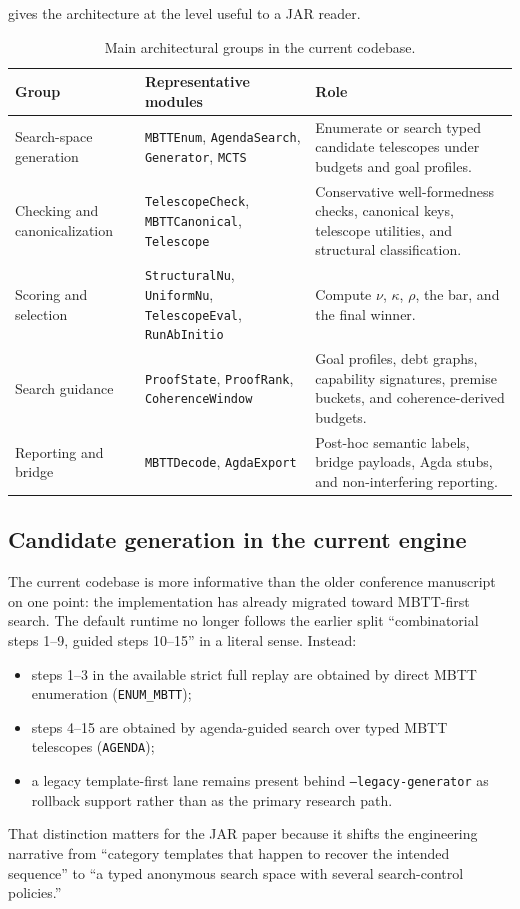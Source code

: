 \documentclass[11pt,a4paper]{article}
\begin{document}
 gives the architecture at the level useful to a JAR reader.

\begin{table}[H]
\centering
\caption{Main architectural groups in the current codebase.}
\label{tab:module-groups}
\small
\begin{tabular}{@{}p{3.2cm}p{5.0cm}p{6.0cm}@{}}
\toprule
Group & Representative modules & Role \\
\midrule
Search-space generation & \texttt{MBTTEnum}, \texttt{AgendaSearch}, \texttt{Generator}, \texttt{MCTS} & Enumerate or search typed candidate telescopes under budgets and goal profiles. \\
Checking and canonicalization & \texttt{TelescopeCheck}, \texttt{MBTTCanonical}, \texttt{Telescope} & Conservative well-formedness checks, canonical keys, telescope utilities, and structural classification. \\
Scoring and selection & \texttt{StructuralNu}, \texttt{UniformNu}, \texttt{TelescopeEval}, \texttt{RunAbInitio} & Compute $\nu$, $\kappa$, $\rho$, the bar, and the final winner. \\
Search guidance & \texttt{ProofState}, \texttt{ProofRank}, \texttt{CoherenceWindow} & Goal profiles, debt graphs, capability signatures, premise buckets, and coherence-derived budgets. \\
Reporting and bridge & \texttt{MBTTDecode}, \texttt{AgdaExport} & Post-hoc semantic labels, bridge payloads, Agda stubs, and non-interfering reporting. \\
\bottomrule
\end{tabular}
\end{table}

\subsection{Candidate generation in the current engine}

The current codebase is more informative than the older conference manuscript on one point: the implementation has already migrated toward MBTT-first search. The default runtime no longer follows the earlier split ``combinatorial steps 1--9, guided steps 10--15'' in a literal sense. Instead:
\begin{itemize}[nosep]
  \item steps 1--3 in the available strict full replay are obtained by direct MBTT enumeration (\texttt{ENUM\_MBTT});
  \item steps 4--15 are obtained by agenda-guided search over typed MBTT telescopes (\texttt{AGENDA});
  \item a legacy template-first lane remains present behind \texttt{--legacy-generator} as rollback support rather than as the primary research path.
\end{itemize}
That distinction matters for the JAR paper because it shifts the engineering narrative from ``category templates that happen to recover the intended sequence'' to ``a typed anonymous search space with several search-control policies.''
\end{document}
